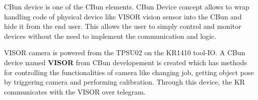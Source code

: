 CBun device is one of the CBun elements. CBun Device concept allows to wrap handling code of physical device like VISOR vision sensor into the CBun and hide it from the end user. This allows the user to simply control and monitor devices without the need to implement the communication and logic. \cite{cbun-device}

VISOR camera is powered from the TPSU02 on the KR1410 tool-IO.
A CBun device named \textbf{VISOR} from CBun developement is created which has methods for
controlling the functionalities of camera like changing job, getting object pose by triggering camera and performing calibration. Through this
device, the KR communicates with the VISOR over telegram.

